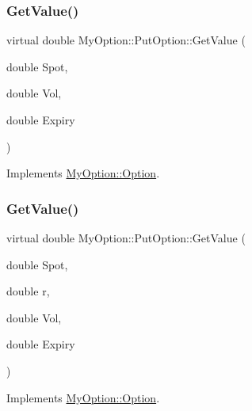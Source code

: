\subsubsection{\texorpdfstring{Get\+Value()}{GetValue()}\hspace{0.1cm}{\footnotesize\ttfamily [2/3]}}
{\footnotesize\ttfamily virtual double My\+Option\+::\+Put\+Option\+::\+Get\+Value (\begin{DoxyParamCaption}\item[{double}]{Spot,  }\item[{double}]{Vol,  }\item[{double}]{Expiry }\end{DoxyParamCaption})\hspace{0.3cm}{\ttfamily [virtual]}}



Implements \hyperlink{classMyOption_1_1Option_a78fa248dcb939e0ebaefbb944d5d9cf8}{My\+Option\+::\+Option}.

\hypertarget{classMyOption_1_1PutOption_a997691a3e08cf0dbf148e24b8fe80dd0}{}\label{classMyOption_1_1PutOption_a997691a3e08cf0dbf148e24b8fe80dd0} 
\subsubsection{\texorpdfstring{Get\+Value()}{GetValue()}\hspace{0.1cm}{\footnotesize\ttfamily [3/3]}}
{\footnotesize\ttfamily virtual double My\+Option\+::\+Put\+Option\+::\+Get\+Value (\begin{DoxyParamCaption}\item[{double}]{Spot,  }\item[{double}]{r,  }\item[{double}]{Vol,  }\item[{double}]{Expiry }\end{DoxyParamCaption})\hspace{0.3cm}{\ttfamily [virtual]}}



Implements \hyperlink{classMyOption_1_1Option_a62422d3dc60eabe65cfa94d2a452f5f8}{My\+Option\+::\+Option}.

\hypertarget{classMyOption_1_1PutOption_a35f98855719f9920fa8176deb6bfd75b}{}\label{classMyOption_1_1PutOption_a35f98855719f9920fa8176deb6bfd75b} 
